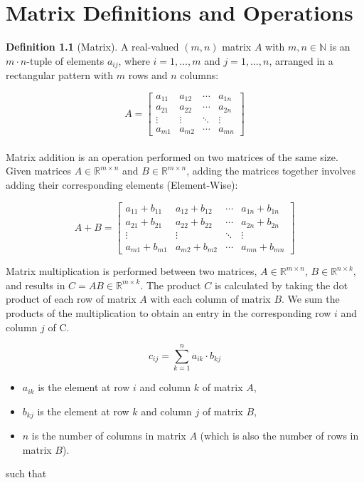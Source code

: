 \documentclass{report}
\begin{document}
\section{Matrix Definitions and Operations}
\noindent \textbf{Definition 1.1} (Matrix).
A real-valued $(m, n)$ matrix $A$ with $m, n \in \mathbb{N}$ is an $m \cdot n$-tuple of elements $a_{ij}$, where $i = 1, \ldots, m$ and $j = 1, \ldots, n$, arranged in a rectangular pattern with $m$ rows and $n$ columns:

\[ A = \begin{bmatrix} 
a_{11} & a_{12} & \cdots & a_{1n} \\
a_{21} & a_{22} & \cdots & a_{2n} \\
\vdots & \vdots & \ddots & \vdots \\
a_{m1} & a_{m2} & \cdots & a_{mn} 
\end{bmatrix} \]
\\
\noindent
Matrix addition is an operation performed on two matrices of the same size. Given matrices $A \in \mathbb{R}^{m\times n}$ and $B \in \mathbb{R}^{m\times n}$, adding the matrices together involves adding their corresponding elements (Element-Wise):


\[ A + B = \begin{bmatrix}
a_{11} + b_{11} & a_{12} + b_{12} & \cdots & a_{1n} + b_{1n} \\
a_{21} + b_{21} & a_{22} + b_{22} & \cdots & a_{2n} + b_{2n} \\
\vdots & \vdots & \ddots & \vdots \\
a_{m1} + b_{m1} & a_{m2} + b_{m2} & \cdots & a_{mn} + b_{mn}
\end{bmatrix} \]

\noindent Matrix multiplication is performed between two matrices, $A \in \mathbb{R}^{m\times n}$, $B \in \mathbb{R}^{n \times k}$, and results in $C = AB \in \mathbb{R}^{m \times k}$. The product \( C \) is calculated by taking the dot product of each row of matrix \( A \) with each column of matrix \( B \). We sum the products of the multiplication to obtain an entry in the corresponding row $i$ and column $j$ of C.

\[ c_{ij} = \sum_{k=1}^{n} a_{ik} \cdot b_{kj} \] 
\begin{itemize}
    \item $a_{ik}$ is the element at row $i$ and column $k$ of matrix $A$,
    \item $b_{kj}$ is the element at row $k$ and column $j$ of matrix $B$,
    \item $n$ is the number of columns in matrix $A$ (which is also the number of rows in matrix $B$).
\end{itemize}
such that
\end{document}
